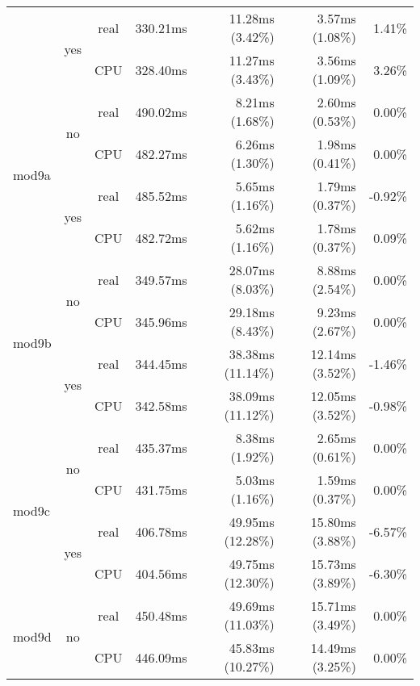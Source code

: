 \documentclass[en]{pracamgr}
\begin{document}
\begin{appendices}
\begin{small}
\begin{longtable}{|l|c|c|r|r|r|r|}
                          \cline{2-7}
                          & \multirow{2}{*}{yes} & real & 330.21ms & 11.28ms (3.42\%) & 3.57ms (1.08\%) & 1.41\% \\*
                          &                      & CPU  & 328.40ms & 11.27ms (3.43\%) & 3.56ms (1.09\%) & 3.26\% \\
\hline
\multirow{4}{*}{mod9a}    & \multirow{2}{*}{no}  & real & 490.02ms & 8.21ms (1.68\%) & 2.60ms (0.53\%) & 0.00\% \\*
                          &                      & CPU  & 482.27ms & 6.26ms (1.30\%) & 1.98ms (0.41\%) & 0.00\% \\*
                          \cline{2-7}
                          & \multirow{2}{*}{yes} & real & 485.52ms & 5.65ms (1.16\%) & 1.79ms (0.37\%) & -0.92\% \\*
                          &                      & CPU  & 482.72ms & 5.62ms (1.16\%) & 1.78ms (0.37\%) & 0.09\% \\
\hline
\multirow{4}{*}{mod9b}    & \multirow{2}{*}{no}  & real & 349.57ms & 28.07ms (8.03\%) & 8.88ms (2.54\%) & 0.00\% \\*
                          &                      & CPU  & 345.96ms & 29.18ms (8.43\%) & 9.23ms (2.67\%) & 0.00\% \\*
                          \cline{2-7}
                          & \multirow{2}{*}{yes} & real & 344.45ms & 38.38ms (11.14\%) & 12.14ms (3.52\%) & -1.46\% \\*
                          &                      & CPU  & 342.58ms & 38.09ms (11.12\%) & 12.05ms (3.52\%) & -0.98\% \\
\hline
\multirow{4}{*}{mod9c}    & \multirow{2}{*}{no}  & real & 435.37ms & 8.38ms (1.92\%) & 2.65ms (0.61\%) & 0.00\% \\*
                          &                      & CPU  & 431.75ms & 5.03ms (1.16\%) & 1.59ms (0.37\%) & 0.00\% \\*
                          \cline{2-7}
                          & \multirow{2}{*}{yes} & real & 406.78ms & 49.95ms (12.28\%) & 15.80ms (3.88\%) & -6.57\% \\*
                          &                      & CPU  & 404.56ms & 49.75ms (12.30\%) & 15.73ms (3.89\%) & -6.30\% \\
\hline
\multirow{4}{*}{mod9d}    & \multirow{2}{*}{no}  & real & 450.48ms & 49.69ms (11.03\%) & 15.71ms (3.49\%) & 0.00\% \\*
                          &                      & CPU  & 446.09ms & 45.83ms (10.27\%) & 14.49ms (3.25\%) & 0.00\% \\*

\end{longtable}
\end{small}
\end{appendices}
\end{document}
